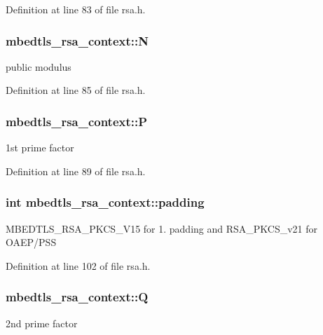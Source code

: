 Definition at line 83 of file rsa.\-h.

\hypertarget{structmbedtls__rsa__context_a359cae81bccf5cfd2f37f98d1b790707}{
\subsubsection[{N}]{ mbedtls\-\_\-rsa\-\_\-context\-::\-N}}\label{structmbedtls__rsa__context_a359cae81bccf5cfd2f37f98d1b790707}
public modulus 

Definition at line 85 of file rsa.\-h.

\hypertarget{structmbedtls__rsa__context_abb8c0a5e2c22d617ff2fc3b2a81ab53c}{
\subsubsection[{P}]{ mbedtls\-\_\-rsa\-\_\-context\-::\-P}}\label{structmbedtls__rsa__context_abb8c0a5e2c22d617ff2fc3b2a81ab53c}
1st prime factor 

Definition at line 89 of file rsa.\-h.

\hypertarget{structmbedtls__rsa__context_ac78a4848175e4921f6beb677f4a49496}{
\subsubsection[{padding}]{\setlength{\rightskip}{0pt plus 5cm}int mbedtls\-\_\-rsa\-\_\-context\-::padding}}\label{structmbedtls__rsa__context_ac78a4848175e4921f6beb677f4a49496}
M\-B\-E\-D\-T\-L\-S\-\_\-\-R\-S\-A\-\_\-\-P\-K\-C\-S\-\_\-\-V15 for 1. padding and R\-S\-A\-\_\-\-P\-K\-C\-S\-\_\-v21 for O\-A\-E\-P/\-P\-S\-S 

Definition at line 102 of file rsa.\-h.

\hypertarget{structmbedtls__rsa__context_a72efb64a1c63318ced5869e570c7cce3}{
\subsubsection[{Q}]{ mbedtls\-\_\-rsa\-\_\-context\-::\-Q}}\label{structmbedtls__rsa__context_a72efb64a1c63318ced5869e570c7cce3}
2nd prime factor 

